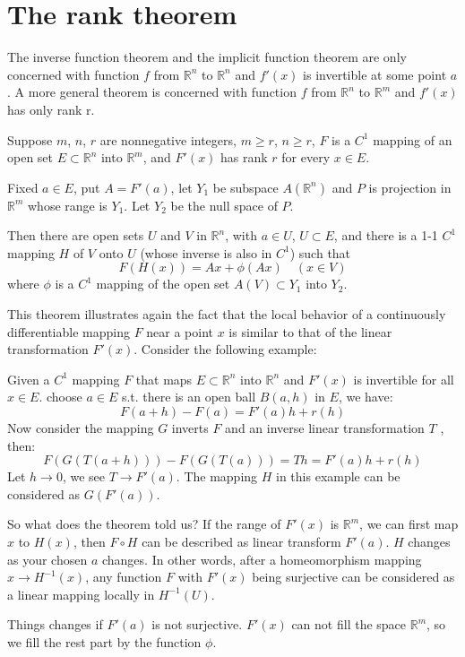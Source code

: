 \section{The rank theorem}
The inverse function theorem and the implicit function theorem are only concerned with function $f$ from $\mathbb{R}^n$ to $\mathbb{R}^n$ and $f'(x)$ is invertible at some point $a$. A more general theorem is concerned with function $f$ from $\mathbb{R}^n$ to $\mathbb{R}^m$ and $f'(x)$ has only rank r.\par
\begin{theorem}
    Suppose $m$, $n$, $r$ are nonnegative integers, $m\geq r$, $n\geq r$, $F$ is a $C^1$ mapping of an open set $E\subset \mathbb{R}^n$ into $\mathbb{R}^m$, and $F'(x)$ has rank $r$ for every $x\in E$.\par
    Fixed $a\in E$, put $A=F'(a)$, let $Y_1$ be subspace $A(\mathbb{R}^n)$ and $P$ is projection in $\mathbb{R}^m$ whose range is $Y_1$. Let $Y_2$ be the null space of $P$.\par
    Then there are open sets $U$ and $V$ in $\mathbb{R}^n$, with $a\in U$, $U\subset E$, and there is a 1-1 $C^1$ mapping $H$ of $V$ onto $U$ (whose inverse is also in $C^1$) such that
    \begin{equation*}
        F(H(x))=Ax+\phi(Ax)\quad (x\in V)
    \end{equation*}
    where $\phi$ is a $C^1$ mapping of the open set $A(V)\subset Y_1$ into $Y_2$.
\end{theorem}
This theorem illustrates again the fact that the local behavior of a continuously differentiable mapping $F$ near a point $x$ is similar to that of the linear transformation $F'(x)$. Consider the following example:\par
Given a $C^1$ mapping $F$ that maps $E\subset \mathbb{R}^n$ into $\mathbb{R}^n$ and $F'(x)$ is invertible for all $x\in E$. choose $a\in E$ s.t. there is an open ball $B(a,h)$ in $E$, we have:
\begin{equation*}
    F(a+h)-F(a)=F'(a)h+r(h)
\end{equation*}
Now consider the mapping $G$ inverts $F$ and an inverse linear transformation $T$ , then:
\begin{equation*}
    F(G(T(a+h)))-F(G(T(a)))=Th=F'(a)h+r(h)
\end{equation*}
Let $h\to 0$, we see $T\to F'(a)$. The mapping $H$ in this example can be considered as $G(F'(a))$.\par
So what does the theorem told us? If the range of $F'(x)$ is $\mathbb{R}^m$, we can first map $x$ to $H(x)$, then $F\circ H$ can be described as linear transform $F'(a)$. $H$ changes as your chosen $a$ changes. In other words, after a homeomorphism mapping $x\to H^{-1}(x)$, any function $F$ with $F'(x)$ being surjective can be considered as a linear mapping locally in $H^{-1}(U)$.\par
Things changes if $F'(a)$ is not surjective. $F'(x)$ can not fill the space $\mathbb{R}^m$, so we fill the rest part by the function $\phi$.

